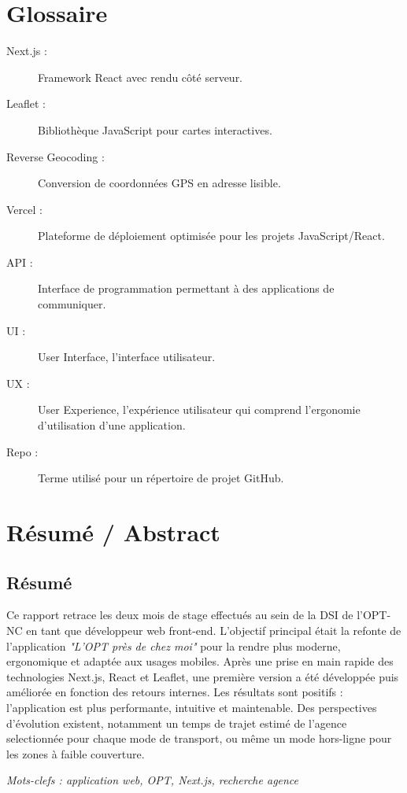 \documentclass[12pt,a4paper]{report}
\begin{document}
\chapter{Glossaire}
\begin{description}
    \item[Next.js :] Framework React avec rendu côté serveur.
    \item[Leaflet :] Bibliothèque JavaScript pour cartes interactives.
    \item[Reverse Geocoding :] Conversion de coordonnées GPS en adresse lisible.
    \item[Vercel :] Plateforme de déploiement optimisée pour les projets JavaScript/React.
    \item[API :] Interface de programmation permettant à des applications de communiquer.
    \item[UI :] User Interface, l'interface utilisateur.
    \item[UX :] User Experience, l'expérience utilisateur qui comprend l'ergonomie d'utilisation d'une application.
    \item[Repo :] Terme utilisé pour un répertoire de projet GitHub.
\end{description}

\chapter*{Résumé / Abstract}

\section*{Résumé}
Ce rapport retrace les deux mois de stage effectués au sein de la DSI de l’OPT-NC en tant que développeur web front-end.  
L’objectif principal était la refonte de l’application \textit{"L’OPT près de chez moi"} pour la rendre plus moderne, ergonomique et adaptée aux usages mobiles.  
Après une prise en main rapide des technologies Next.js, React et Leaflet, une première version a été développée puis améliorée en fonction des retours internes.  
Les résultats sont positifs : l’application est plus performante, intuitive et maintenable.  
Des perspectives d’évolution existent, notamment un temps de trajet estimé de l'agence selectionnée pour chaque mode de transport, ou même un mode hors-ligne pour les zones à faible couverture.

\vspace{1cm}
\textit{Mots-clefs : application web, OPT, Next.js, recherche agence}
\end{document}
